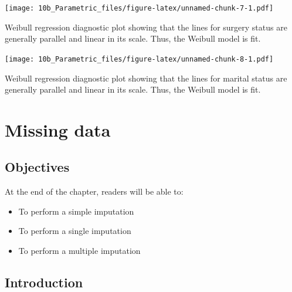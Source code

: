 \documentclass[
  10pt,
]{krantz}
\newenvironment{Shaded}{\begin{snugshade}}{\end{snugshade}}
\newcommand{\AttributeTok}[1]{\textcolor[rgb]{0.77,0.63,0.00}{#1}}
\newcommand{\DecValTok}[1]{\textcolor[rgb]{0.00,0.00,0.81}{#1}}
\newcommand{\FunctionTok}[1]{\textcolor[rgb]{0.00,0.00,0.00}{#1}}
\newcommand{\NormalTok}[1]{#1}
\newcommand{\SpecialCharTok}[1]{\textcolor[rgb]{0.00,0.00,0.00}{#1}}
\providecommand{\tightlist}{%
  \setlength{\itemsep}{0pt}\setlength{\parskip}{0pt}}
\begin{document}
\texttt{[image: 10b\_Parametric\_files/figure-latex/unnamed-chunk-7-1.pdf]}

Weibull regression diagnostic plot showing that the lines for surgery status are generally parallel and linear in its scale. Thus, the Weibull model is fit.

\begin{Shaded}
\end{Shaded}

\texttt{[image: 10b\_Parametric\_files/figure-latex/unnamed-chunk-8-1.pdf]}

Weibull regression diagnostic plot showing that the lines for marital status are generally parallel and linear in its scale. Thus, the Weibull model is fit.

\hypertarget{missing-data}{%
\chapter{Missing data}\label{missing-data}}

\hypertarget{objectives-11}{%
\section{Objectives}\label{objectives-11}}

At the end of the chapter, readers will be able to:

\begin{itemize}
\tightlist
\item
  To perform a simple imputation
\item
  To perform a single imputation
\item
  To perform a multiple imputation
\end{itemize}

\hypertarget{introduction-8}{%
\section{Introduction}\label{introduction-8}}
\end{document}
